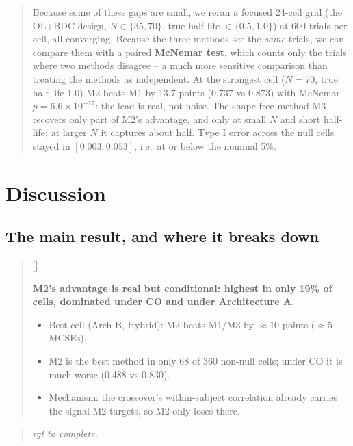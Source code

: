 \documentclass[
  11pt,
]{article}
\newcounter{pgraph}
\newenvironment{bullets}{%
  \stepcounter{pgraph}%
  \begin{quote}\small\sffamily\color[gray]{0.30}%
  {\normalfont\scriptsize\color[gray]{0.58}[\thepgraph]\enspace}}{%
  \end{quote}}
\newenvironment{rgt}{%
  \begin{quote}\small\itshape\color[RGB]{20,60,160}}{%
  \end{quote}}
\newenvironment{orig}{%
  \begin{quote}\normalsize\color[gray]{0.55}}{%
  \end{quote}}
\begin{document}
\begin{orig}
Because some of these gaps are small, we reran a focused 24-cell
grid (the OL+BDC design, \(N \in \{35, 70\}\), true half-life \(\in
\{0.5, 1.0\}\)) at 600 trials per cell, all converging. Because the
three methods see the \emph{same} trials, we can compare them with a
paired \textbf{McNemar test}, which counts only the trials where two
methods disagree -- a much more sensitive comparison than treating
the methods as independent. At the strongest cell (\(N = 70\), true
half-life 1.0) M2 beats M1 by 13.7 points (0.737 vs 0.873) with
McNemar \(p = 6.6 \times 10^{-17}\): the lead is real, not noise. The
shape-free method M3 recovers only part of M2's advantage, and only
at small \(N\) and short half-life; at larger \(N\) it captures about
half. Type I error across the null cells stayed in \([0.003, 0.053]\),
i.e.~at or below the nominal 5\%.

\end{orig}

\section{Discussion}\label{discussion}

\subsection{The main result, and where it breaks down}\label{the-main-result-and-where-it-breaks-down}

\begin{bullets}

\textbf{M2's advantage is real but conditional: highest in only
19\% of cells, dominated under CO and under Architecture A.}

\begin{itemize}\setlength{\itemsep}{2pt}\setlength{\parskip}{0pt}
\item Best cell (Arch B, Hybrid): M2 beats M1/M3 by $\approx 10$
points ($\approx 5$ MCSEs).
\item M2 is the best method in only 68 of 360 non-null cells; under
CO it is much worse (0.488 vs 0.830).
\item Mechanism: the crossover's within-subject correlation already
carries the signal M2 targets, so M2 only loses there.
\end{itemize}

\end{bullets}

\begin{rgt}
rgt to complete.

\end{rgt}
\end{document}
